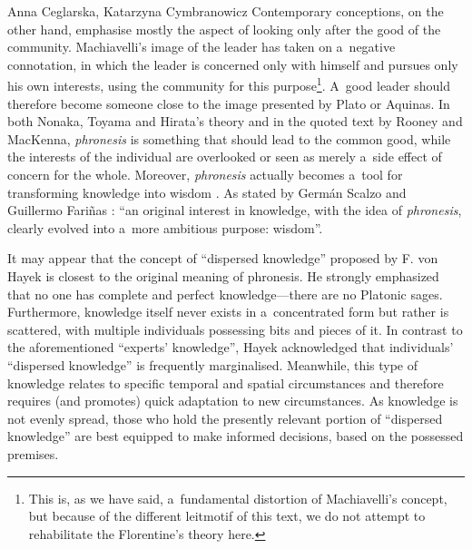 \begin{artengenv2auth}{Anna Ceglarska, Katarzyna Cymbranowicz}
Contemporary conceptions, on the other hand, emphasise mostly the aspect of looking only after the good of the community. Machiavelli's image of the leader has taken on a~negative connotation, in which the leader is concerned only with himself and pursues only his own interests, using the community for this purpose\footnote{This is, as we have said, a~fundamental distortion of Machiavelli's concept, but because of the different leitmotif of this text, we do not attempt to rehabilitate the Florentine's theory here.}. A~good leader should therefore become someone close to the image presented by Plato or Aquinas. In both Nonaka, Toyama and Hirata's theory and in the quoted text by Rooney and MacKenna, \textit{phronesis} is something that should lead to the common good, while the interests of the individual are overlooked or seen as merely a~side effect of concern for the whole. Moreover, \textit{phronesis} actually becomes a~tool for transforming knowledge into wisdom 
\parencite[][p.67]{nonaka_managing_2008}. %
 As stated by Germán Scalzo and Guillermo Fariñas 
\parencite*[][p.30]{scalzo_aristotelian_2018}: %
 ``an original interest in knowledge, with the idea of \textit{phronesis}, clearly evolved into a~more ambitious purpose: wisdom''.



It may appear that the concept of ``dispersed knowledge'' proposed by F. von Hayek 
\parencite*[][]{hayek_use_1945} %
 is closest to the original meaning of phronesis. He strongly emphasized that no one has complete and perfect knowledge---there are no Platonic sages. Furthermore, knowledge itself never exists in a~concentrated form but rather is scattered, with multiple individuals possessing bits and pieces of it. In contrast to the aforementioned ``experts' knowledge'', Hayek acknowledged that individuals' ``dispersed knowledge'' is frequently marginalised. Meanwhile, this type of knowledge relates to specific temporal and spatial circumstances and therefore requires (and promotes) quick adaptation to new circumstances. As knowledge is not evenly spread, those who hold the presently relevant portion of ``dispersed knowledge'' are best equipped to make informed decisions, based on the possessed premises.




\end{artengenv2auth}
